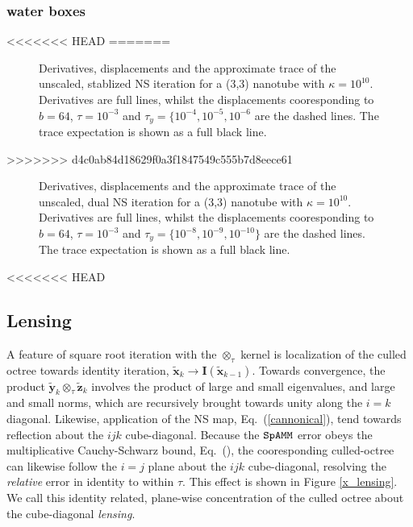 \documentclass[letterpaper,twocolumn,amsmath,amsfont,amssymb,english,aps,jcp,preprintnumbers,groupaddress,nofootinbib,tightenlines]{revtex4}
\newcommand{\mat}[1]{\boldsymbol{#1}}
\newcommand{\ot}{ {\scriptstyle \otimes}_{ \tau } }
\begin{document}
\subsubsection{water boxes}


<<<<<<< HEAD
=======
\begin{figure}[h]
\caption{Derivatives, displacements and the approximate trace of the unscaled, stablized NS iteration for a (3,3)
nanotube with $\kappa =10^{10}$.
Derivatives are full lines, whilst the displacements cooresponding to $b=64$, $\tau=10^{-3}$ and
$\tau_y=\{10^{-4}, 10^{-5}, 10^{-6}$  are the dashed lines.  The trace expectation is shown as a full black line. }
\end{figure}
>>>>>>> d4c0ab84d18629f0a3f1847549c555b7d8eece61


\begin{figure}[h]
\caption{Derivatives, displacements and the approximate trace of the unscaled, dual NS iteration for a (3,3) nanotube with $\kappa =10^{10}$.
Derivatives are full lines, whilst the displacements cooresponding to $b=64$, $\tau=10^{-3}$ and $\tau_y=\{10^{-8}, 10^{-9}, 10^{-10}\}$
are the dashed lines.  The trace expectation is shown as a full black line. }
\end{figure}

<<<<<<< HEAD

\subsection{Lensing}
A feature of square root iteration with the $\ot$ kernel is localization of the culled octree towards identity iteration, 
$\widetilde{\mat{x}}_k \rightarrow \mat{I}\left( \widetilde{\mat{x}}_{k-1} \right)$.  Towards convergence,  
the product $\widetilde{\mat{y}}_k \ot \widetilde{\mat{z}}_k$ involves the product of large and small eigenvalues, and large and small norms, 
which are recursively brought towards unity along the $i=k$ diagonal.  Likewise, application of the NS map, Eq.~(\ref{cannonical}),  tend towards 
reflection about the $ijk$ cube-diagonal.   Because the $\tt SpAMM$ error obeys the multiplicative Cauchy-Schwarz bound, Eq.~(),  the 
cooresponding culled-octree can likewise follow the $i=j$ plane about the $ijk$ cube-diagonal, resolving the {\em relative} error in identity to within $\tau$.    This effect is shown in Figure \ref{x_lensing}.   
We call this identity related,  plane-wise concentration of the culled octree  about the cube-diagonal {\em lensing}.  
\end{document}
